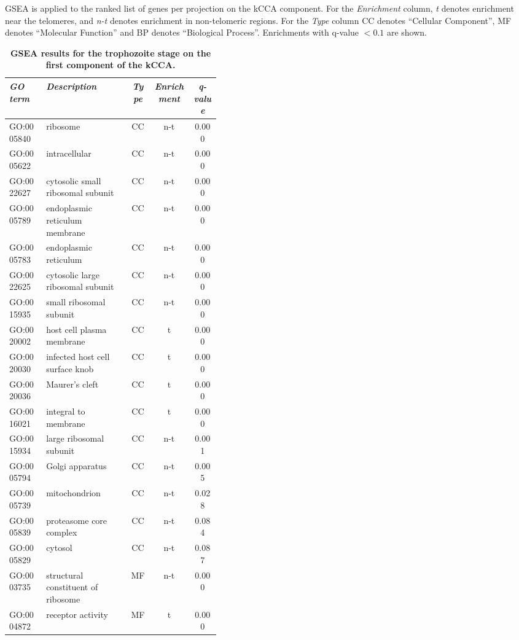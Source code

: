 \begin{table}
\caption{{\bf GSEA results for the trophozoite stage on the first component of the
kCCA.}}
{\normalsize GSEA is applied to the ranked list of genes per projection on the kCCA
component.
For the \emph{Enrichment} column, \emph{t} denotes enrichment near the
telomeres, and \emph{n-t} denotes enrichment in non-telomeric regions.
For the \emph{Type} column CC denotes ``Cellular Component'',
MF denotes ``Molecular Function'' and BP denotes ``Biological Process''.
Enrichments with q-value $< 0.1$ are shown.}
\vspace{10pt}
\begin{center}
\begin{tabular}{lp{0.4\linewidth}ccc}
\hline
\emph{GO term }&  \emph{Description} & \emph{Type} & \emph{Enrichment} & \emph{q-value}  \\
\hline
GO:0005840 & ribosome & CC & n-t & 0.000\\
GO:0005622 & intracellular & CC & n-t & 0.000\\
GO:0022627 & cytosolic small ribosomal subunit & CC & n-t & 0.000\\
GO:0005789 & endoplasmic reticulum membrane & CC & n-t & 0.000\\
GO:0005783 & endoplasmic reticulum & CC & n-t & 0.000\\
GO:0022625 & cytosolic large ribosomal subunit & CC & n-t & 0.000\\
GO:0015935 & small ribosomal subunit & CC & n-t & 0.000\\
GO:0020002 & host cell plasma membrane & CC & t & 0.000\\
GO:0020030 & infected host cell surface knob & CC & t & 0.000\\
GO:0020036 & Maurer's cleft & CC & t & 0.000\\
GO:0016021 & integral to membrane & CC & t & 0.000\\
GO:0015934 & large ribosomal subunit & CC & n-t & 0.001\\
GO:0005794 & Golgi apparatus & CC & n-t & 0.005\\
GO:0005739 & mitochondrion & CC & n-t & 0.028\\
GO:0005839 & proteasome core complex & CC & n-t & 0.084\\
GO:0005829 & cytosol & CC & n-t & 0.087\\
GO:0003735 & structural constituent of ribosome & MF & n-t & 0.000\\
GO:0004872 & receptor activity & MF & t & 0.000\\

\end{tabular}
\end{center}
\end{table}
